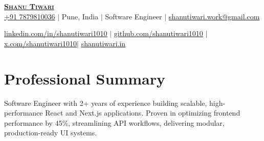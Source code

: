 \documentclass[letterpaper,10pt]{article}
\begin{document}
\begin{center}
  \textbf{\Huge \scshape \href{https://shanutiwari.in}{Shanu Tiwari}} \\ \vspace{5pt}
  \href{tel:7879810036}{+91 7879810036} $|$
  {Pune, India} $|$
  {Software Engineer} $|$
  \href{mailto:shanutiwari.work@gmail.com}{shanutiwari.work@gmail.com} \\ \vspace{1pt}

  \href{https://linkedin.com/in/shanutiwari1010}{\underline{linkedin.com/in/shanutiwari1010}} $|$
  \href{https://github.com/shanutiwari1010}{\underline{github.com/shanutiwari1010}} $|$
  \href{https://twitter.com/shanutiwari1010}{\underline{x.com/shanutiwari1010}}$|$
   \href{https://shanutiwari.in}{\underline{shanutiwari.in}} 
  
\end{center}



\section{Professional Summary}
Software Engineer with 2+ years of experience building scalable, high-performance React and Next.js applications. Proven in optimizing frontend performance by 45\%, streamlining API workflows, delivering modular, production-ready UI systems.



\end{document}

